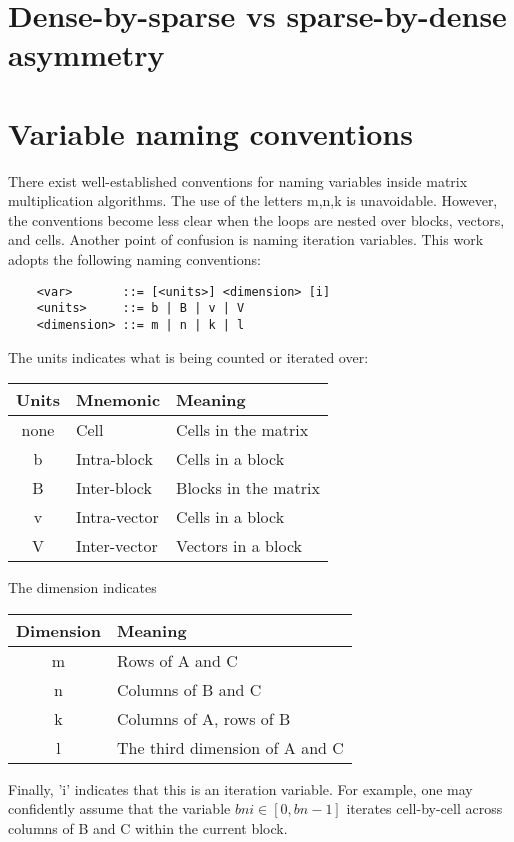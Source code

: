 \section{Dense-by-sparse vs sparse-by-dense asymmetry}

\section{Variable naming conventions}


There exist well-established conventions for naming variables inside matrix multiplication algorithms. 
The use of the letters m,n,k is unavoidable. However, the conventions become less clear when the loops are nested over blocks, vectors, and cells.
Another point of confusion is naming iteration variables. This work adopts the following naming conventions:

  \begin{verbatim} 
    <var>       ::= [<units>] <dimension> [i]
    <units>     ::= b | B | v | V
    <dimension> ::= m | n | k | l
  \end{verbatim}

The units indicates what is being counted or iterated over:

    \begin{tabular}{cll}
\toprule
Units    & Mnemonic & Meaning \\
\midrule

none  & Cell          & Cells in the matrix      \\
b     & Intra-block   & Cells in a block         \\
B     & Inter-block   & Blocks in the matrix     \\
v     & Intra-vector  & Cells in a block         \\
V     & Inter-vector  & Vectors in a block       \\
\bottomrule
\end{tabular}

The dimension indicates 

\begin{tabular}{cl}
\toprule
Dimension    & Meaning \\
\midrule
m & Rows of A and C \\
n & Columns of B and C \\
k & Columns of A, rows of B \\
l & The third dimension of A and C\\
\bottomrule
\end{tabular}


Finally, 'i' indicates that this is an iteration variable.
For example, one may confidently assume that the variable $bni \in [0, bn-1]$ iterates cell-by-cell across columns of B and C within the current block.

